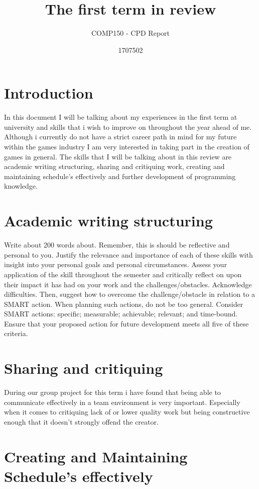 \documentclass{scrartcl}
\title{The first term in review }
\subtitle{COMP150 - CPD Report}
\author{1707502}
\begin{document}
\maketitle

\section{Introduction}
In this document I will be talking about my experiences in the first term at university and skills that i wish to improve on throughout the year ahead of me.
Although i currently do not have a strict career path in mind for my future within the games industry I am very interested in taking part in the creation of games in general. The skills that I will be talking about in this review are academic writing structuring, sharing and critiquing work, creating and maintaining schedule's effectively and further development of programming knowledge.   

\section{Academic writing structuring}

Write about 200 words about. Remember, this is should be reflective and personal to you. Justify the relevance and importance of each of these skills with insight into your personal goals and personal circumstances. Assess your application of the skill throughout the semester and critically reflect on upon their impact it has had on your work and the challenges/obstacles. Acknowledge difficulties. Then, suggest how to overcome the challenge/obstacle in relation to a SMART action. When planning such actions, do not be too general. Consider SMART actions:
specific; measurable; achievable; relevant; and time-bound. Ensure that your proposed action for future development meets all five of these criteria.

\section{Sharing and critiquing}

During our group project for this term i have found that being able to communicate effectively in a team environment is very important. Especially when it comes to critiquing lack of or lower quality work but being constructive enough that it doesn't strongly offend the creator. 

\section{Creating and Maintaining Schedule's effectively}
\end{document}
